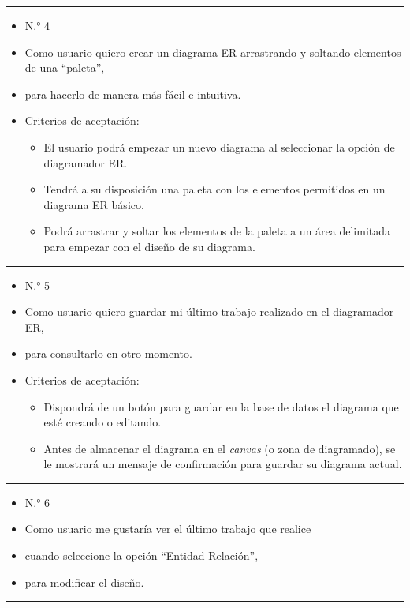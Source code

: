 \noindent\rule{\textwidth}{1pt}
\begin{itemize}
	\item N.° 4
	\item Como usuario quiero crear un diagrama ER arrastrando y soltando elementos de una ``paleta'',
	\item para hacerlo de manera más fácil e intuitiva.
	\item Criterios de aceptación:
	\begin{itemize}
		\item El usuario podrá empezar un nuevo diagrama al seleccionar la opción de diagramador ER.
		\item Tendrá a su disposición una paleta con los elementos permitidos en un diagrama ER básico.
		\item Podrá arrastrar y soltar los elementos de la paleta a un área delimitada para empezar con el diseño de su diagrama.
	\end{itemize}
\end{itemize}
\noindent\rule{\textwidth}{1pt}
\begin{itemize}
	\item N.° 5
	\item Como usuario quiero guardar mi último trabajo realizado en el diagramador ER,
	\item para consultarlo en otro momento.
	\item Criterios de aceptación:
	\begin{itemize}
		\item Dispondrá de un botón para guardar en la base de datos el diagrama que esté creando o editando.
		\item Antes de almacenar el diagrama en el \textit{canvas} (o zona de diagramado), se le mostrará un mensaje de confirmación para guardar su diagrama actual.
	\end{itemize}
\end{itemize}
\noindent\rule{\textwidth}{1pt}
\begin{itemize}
	\item N.° 6
	\item Como usuario me gustaría ver el último trabajo que realice
	\item cuando seleccione la opción ``Entidad-Relación'',
	\item para modificar el diseño.
\end{itemize}
\noindent\rule{\textwidth}{1pt}
